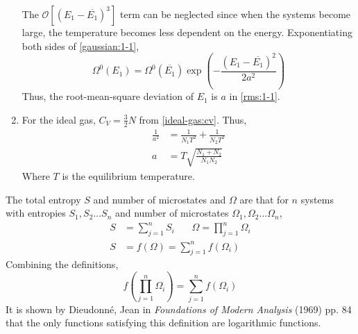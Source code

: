 \documentclass{article}
\begin{document}
\begin{sol}[1.1]
\begin{enumerate}[label=\textbf{(\alph*)}]
\begin{equation}
        \end{equation}
        The $\mathcal{O}\left[(E_1-\overline{E_1})^3\right]$ term can be neglected since when the systems become large, the temperature becomes less dependent on the energy.
        Exponentiating both sides of \eqref{gaussian:1-1},
        \begin{equation}
            \Omega^0(E_1)=\Omega^0(\overline{E_1})\exp\left(-\frac{(E_1-\overline{E_1})^2}{2a^2}\right)
        \end{equation}
        Thus, the root-mean-square deviation of $E_1$ is $a$ in \eqref{rms:1-1}.
        \item For the ideal gas, $C_V=\frac{3}{2}N$ from \eqref{ideal-gas:cv}. Thus, 
        \begin{align}
            \frac{1}{a^2}&=\frac{1}{N_1T^2}+\frac{1}{N_2T^2}\\
            a&=T\sqrt{\frac{N_1+N_2}{N_1N_2}}
        \end{align}
        Where $T$ is the equilibrium temperature.
    \end{enumerate}
\end{sol}
\begin{sol}[1.2]
    The total entropy $S$ and number of microstates and $\Omega$ are that for $n$ systems with entropies $S_1,S_2\dots S_n$ and number of microstates $\Omega_1,\Omega_2\dots\Omega_n$,
    \begin{align}
        S&=\sum_{j=1}^n S_i\:\:\:\:\:\:\:\:\Omega=\prod_{j=1}^n\Omega_i\\
        S&=f(\Omega)=\sum_{j=1}^n f(\Omega_i)
    \end{align}
    Combining the definitions,
    \begin{equation}
        f\left(\prod_{j=1}^n\Omega_i\right)=\sum_{j=1}^nf(\Omega_i)
    \end{equation}
    It is shown by Dieudonné, Jean in \textit{Foundations of Modern Analysis} (1969) pp. 84 that the only functions satisfying this definition are logarithmic functions.
\end{sol}
\end{document}
